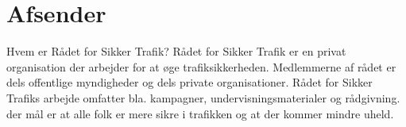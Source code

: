 \chapter{Afsender}
Hvem er Rådet for Sikker Trafik?
Rådet for Sikker Trafik er en privat organisation der arbejder for at øge trafiksikkerheden. Medlemmerne af rådet er dels offentlige myndigheder og dels private organisationer. Rådet for Sikker Trafiks arbejde omfatter bla. kampagner, undervisningsmaterialer og rådgivning. der mål er at alle folk er mere sikre i trafikken og at der kommer mindre uheld. 
